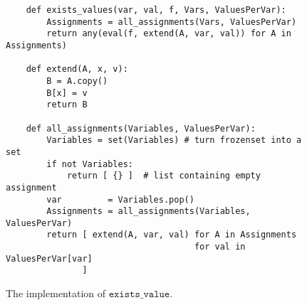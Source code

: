 \begin{figure}[!ht]
\centering
\begin{verbatim}
    def exists_values(var, val, f, Vars, ValuesPerVar):
        Assignments = all_assignments(Vars, ValuesPerVar)
        return any(eval(f, extend(A, var, val)) for A in Assignments)
    
    def extend(A, x, v):
        B = A.copy()
        B[x] = v
        return B
    
    def all_assignments(Variables, ValuesPerVar):
        Variables = set(Variables) # turn frozenset into a set
        if not Variables:
            return [ {} ]  # list containing empty assignment
        var         = Variables.pop()
        Assignments = all_assignments(Variables, ValuesPerVar)
        return [ extend(A, var, val) for A in Assignments 
                                     for val in ValuesPerVar[var]
               ]
\end{verbatim}
\vspace*{-0.3cm}
\caption{The implementation of $\texttt{exists\_value}$.}
\label{fig:Consistency-Solver.ipynb:exists_values}
\end{figure}

